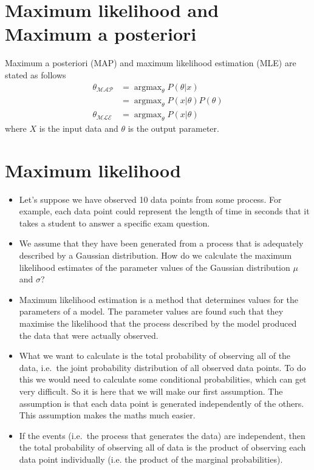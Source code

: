\documentclass{article}
\DeclareMathOperator*{\argmax}{argmax}
\begin{document}
\section{Maximum likelihood and Maximum a posteriori}
Maximum a posteriori (MAP) and maximum likelihood estimation (MLE) are stated as follows
\begin{align*}
\theta_{\mathcal{MAP}} &= \argmax_{\theta} P(\theta|x) \nonumber \\
									&= \argmax_{\theta} P(x|\theta) P(\theta)  \nonumber \\
\theta_{\mathcal{MLE}} &= \argmax_{\theta} P(x|\theta) \nonumber
\end{align*}
where $X$ is the input data and $\theta$ is the output parameter.


\section{Maximum likelihood}

\begin{itemize}
\item Let's suppose we have observed 10 data points from some process. For example, each data point could represent the length of time in seconds that it takes a student to answer a specific exam question.
\item We assume that they have been generated from a process that is adequately described by a Gaussian distribution. How do we calculate the maximum likelihood estimates of the parameter values of the Gaussian distribution $\mu$ and $\sigma$?
\item Maximum likelihood estimation is a method that determines values for the parameters of a model. The parameter values are found such that they maximise the likelihood that the process described by the model produced the data that were actually observed.
\item What we want to calculate is the total probability of observing all of the data, i.e.\ the joint probability distribution of all observed data points. To do this we would need to calculate some conditional probabilities, which can get very difficult. So it is here that we will make our first assumption. The assumption is that each data point is generated independently of the others. This assumption makes the maths much easier. 
\item If the events (i.e.\ the process that generates the data) are independent, then the total probability of observing all of data is the product of observing each data point individually (i.e. the product of the marginal probabilities).
\end{itemize}
\end{document}
